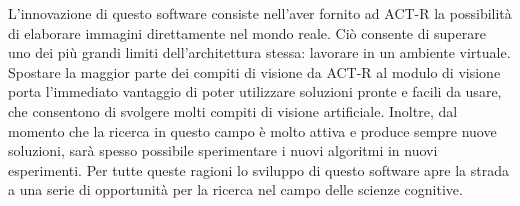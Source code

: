 		L'innovazione di questo software consiste nell'aver fornito ad \mbox{ACT-R} la possibilità di elaborare immagini direttamente nel mondo reale.
		Ciò consente di superare uno dei più grandi limiti dell'architettura stessa: lavorare in un ambiente virtuale.
		Spostare la maggior parte dei compiti di visione da \mbox{ACT-R} al modulo di visione porta l'immediato vantaggio di poter utilizzare soluzioni pronte e facili da usare, che consentono di svolgere molti compiti di visione artificiale.
		Inoltre, dal momento che la ricerca in questo campo è molto attiva e produce sempre nuove soluzioni, sarà spesso possibile sperimentare i nuovi algoritmi in nuovi esperimenti.
		Per tutte queste ragioni lo sviluppo di questo software apre la strada a una serie di opportunità per la ricerca nel campo delle scienze cognitive.
	

 
		





